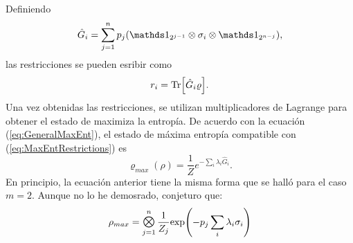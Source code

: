 Definiendo
\begin{equation}\label{eq:Ghat}
    \hat{G}_{i}=\sum_{j=1}^{n}p_{j}(\Id_{2^{j-1}}\otimes\sigma_{i}\otimes\Id_{2^{n-j}}),
\end{equation}
las restricciones se pueden esribir como
\begin{equation}\label{eq:MaxEntRestrictions}
    r_{i}=\Tr[\hat{G}_{i}\varrho].
\end{equation}
Una vez obtenidas las restricciones, se utilizan multiplicadores de Lagrange para obtener el estado de maximiza la entropía. De acuerdo con la ecuación (\ref{eq:GeneralMaxEnt}), el estado de máxima entropía compatible con (\ref{eq:MaxEntRestrictions}) es
\begin{equation}\label{eq:MaxEntLagMult}
    \varrho_{max}(\rho)=\frac{1}{Z}e^{-\sum_{i}\lambda_{i}\hat{G}_{i}}.
\end{equation}
En principio, la ecuación anterior tiene la misma forma que se halló para el caso $m=2$. Aunque no lo he demosrado, conjeturo que:
\begin{equation}
    \rho_{max}=\Motimes_{j=1}^{n}\frac{1}{Z_{j}}\text{exp}\qty(-p_{j}\sum_{i}\lambda_{i}\sigma_{i})
\end{equation}
\newpage
